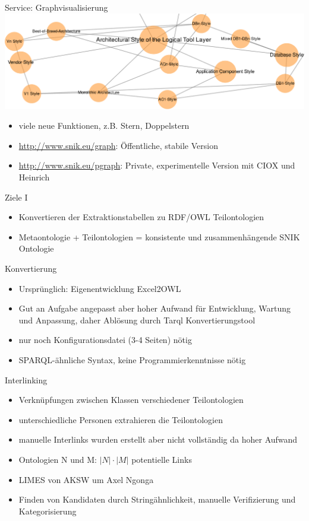 \documentclass{beamer}
\begin{document}
\begin{frame}{Service: Graphvisualisierung}
\includegraphics[width=\textwidth]{img/graph.png}
\begin{itemize}
\item viele neue Funktionen, z.B. Stern, Doppelstern 
\item \url{http://www.snik.eu/graph}: Öffentliche, stabile Version
\item \url{http://www.snik.eu/pgraph}: Private, experimentelle Version mit CIOX und Heinrich 
\end{itemize}
\end{frame}


\begin{frame}{Ziele I}
\begin{itemize}
\item Konvertieren der Extraktionstabellen zu RDF/OWL Teilontologien 
\item Metaontologie + Teilontologien = konsistente und zusammenhängende SNIK Ontologie 
\end{itemize}
\end{frame}

\begin{frame}{Konvertierung}
\begin{itemize}
\item Ursprünglich: Eigenentwicklung Excel2OWL 
\item Gut an Aufgabe angepasst aber hoher Aufwand für Entwicklung, Wartung und Anpassung, daher Ablösung durch Tarql Konvertierungstool
\item nur noch Konfigurationsdatei (3-4 Seiten) nötig
\item SPARQL-ähnliche Syntax, keine Programmierkenntnisse nötig
\end{itemize}
\end{frame}

\begin{frame}{Interlinking}
\begin{itemize}
\item Verknüpfungen zwischen Klassen verschiedener Teilontologien
\item unterschiedliche Personen extrahieren die Teilontologien 
\item manuelle Interlinks wurden erstellt aber nicht vollständig da hoher Aufwand
\item Ontologien N und M: $|N| \cdot |M|$ potentielle Links
\item LIMES von AKSW um Axel Ngonga
\item Finden von Kandidaten durch Stringähnlichkeit, manuelle Verifizierung und Kategorisierung
\end{itemize}
\end{frame}
\end{document}
